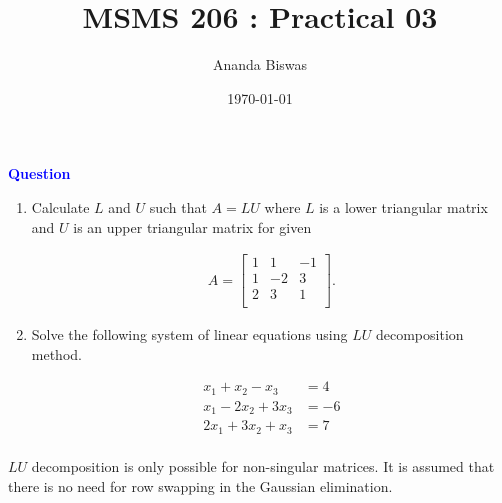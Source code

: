 \documentclass[11pt, a4paper]{article}\usepackage[]{graphicx}\usepackage[]{xcolor}
\title{MSMS 206 : Practical 03}
\author{Ananda Biswas}
\date{\today}
\begin{document}
\maketitle


 \hspace{0.2cm} \textcolor{blue}{\textbf{Question}}

\vspace{0.3cm}

\begin{enumerate}[(1)]

\item Calculate $L$ and $U$ such that $A = LU$ where $L$ is a lower triangular matrix and $U$ is an upper triangular matrix for given

\begin{gather*}
A = 
\begin{bmatrix}
1 & 1 & -1 \\
1 & -2 & 3 \\
2 & 3 & 1 \\
\end{bmatrix}.
\end{gather*}


\item Solve the following system of linear equations using $LU$ decomposition method.

\begin{align*}
x_1 + x_2 - x_3 &= 4 \\
x_1 - 2x_2 + 3x_3 &= -6 \\
2x_1 + 3x_2 + x_3 &= 7 \\
\end{align*}

\end{enumerate}


\faArrowAltCircleRight[regular] \hspace{0.2cm} $LU$ decomposition is only possible for non-singular matrices. It is assumed that there is no need for row swapping in the Gaussian elimination.
\end{document}
